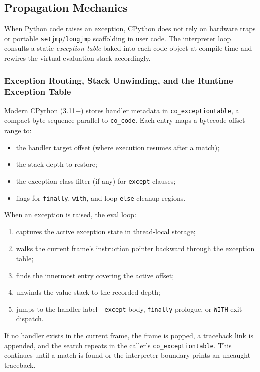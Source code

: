 \subsection{Propagation Mechanics}

When Python code raises an exception, CPython does not rely on hardware traps or portable \texttt{setjmp}/\texttt{longjmp} scaffolding in user code. The interpreter loop consults a static \emph{exception table} baked into each code object at compile time and rewires the virtual evaluation stack accordingly.

\subsubsection{Exception Routing, Stack Unwinding, and the Runtime Exception Table}

Modern CPython (3.11+) stores handler metadata in \texttt{co\_exceptiontable}, a compact byte sequence parallel to \texttt{co\_code}. Each entry maps a bytecode offset range to:

\begin{itemize}
    \item the handler target offset (where execution resumes after a match);
    \item the stack depth to restore;
    \item the exception class filter (if any) for \texttt{except} clauses;
    \item flags for \texttt{finally}, \texttt{with}, and loop-\texttt{else} cleanup regions.
\end{itemize}

When an exception is raised, the eval loop:

\begin{enumerate}
    \item captures the active exception state in thread-local storage;
    \item walks the current frame's instruction pointer backward through the exception table;
    \item finds the innermost entry covering the active offset;
    \item unwinds the value stack to the recorded depth;
    \item jumps to the handler label---\texttt{except} body, \texttt{finally} prologue, or \texttt{WITH} exit dispatch.
\end{enumerate}

If no handler exists in the current frame, the frame is popped, a traceback link is appended, and the search repeats in the caller's \texttt{co\_exceptiontable}. This continues until a match is found or the interpreter boundary prints an uncaught traceback.

